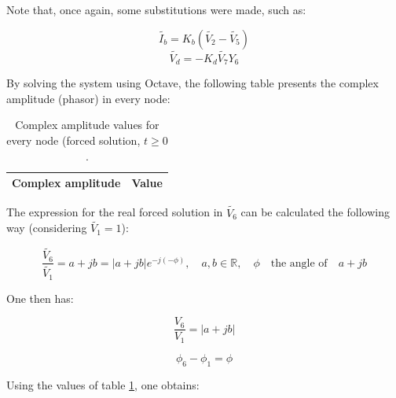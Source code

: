 Note that, once again, some substitutions were made, such as:

\vspace{3mm}
\begin{equation}
  \label{eq5}
   \widetilde{I_b} = K_b(\widetilde{V_2}-\widetilde{V_5})
\end{equation}
\begin{equation}
  \label{eq6}
   \widetilde{V_d}=-K_d\widetilde{V_7}Y_6
\end{equation}
\vspace{3mm}

\par By solving the system using Octave, the following table presents the complex amplitude (phasor) in every node:

\renewcommand{\arraystretch}{1.5}
\begin{table}[h]
  \centering
  \begin{tabular}{|c|c|}
    \hline    
    \textbf{Complex amplitude} & \textbf{Value} \\ \hline
    
  \end{tabular}
  \caption{Complex amplitude values for every node (forced solution, $t\geq0$.}
  \label{tab_3}
\end{table}

\par The expression for the real forced solution in $\widetilde{V_6}$ can be calculated the following way (considering $\widetilde{V_1}=1$):

\vspace{3mm}
\begin{equation}
  \label{eq7}
   \frac{\widetilde{V_6}}{\widetilde{V_1}} = a + jb=|a + jb|e^{-j(-\phi)},\quad a,b \in \mathbb{R},\quad \phi \quad \textrm{the angle of} \quad  a + jb
\end{equation}

\par One then has:

\vspace{3mm}
\begin{equation}
  \label{eq8}
   \frac{V_6}{V_1} = |a + jb|
\end{equation}

\begin{equation}
  \label{eq9}
   \phi_6-\phi_1=\phi
\end{equation}

\par Using the values of table \ref{tab_3}, one obtains:

